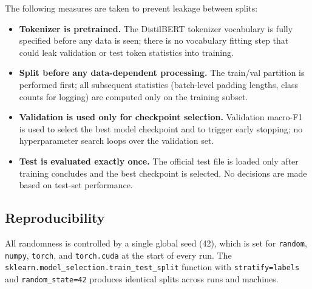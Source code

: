 The following measures are taken to prevent leakage between splits:

\begin{itemize}
    \item \textbf{Tokenizer is pretrained.} The DistilBERT tokenizer vocabulary is fully specified before any data is seen; there is no vocabulary fitting step that could leak validation or test token statistics into training.
    \item \textbf{Split before any data-dependent processing.} The train/val partition is performed first; all subsequent statistics (batch-level padding lengths, class counts for logging) are computed only on the training subset.
    \item \textbf{Validation is used only for checkpoint selection.} Validation macro-F1 is used to select the best model checkpoint and to trigger early stopping; no hyperparameter search loops over the validation set.
    \item \textbf{Test is evaluated exactly once.} The official test file is loaded only after training concludes and the best checkpoint is selected. No decisions are made based on test-set performance.
\end{itemize}

\subsection{Reproducibility}

All randomness is controlled by a single global seed (42), which is set for \texttt{random}, \texttt{numpy}, \texttt{torch}, and \texttt{torch.cuda} at the start of every run. The \texttt{sklearn.model\_selection.train\_test\_split} function with \texttt{stratify=labels} and \texttt{random\_state=42} produces identical splits across runs and machines.
